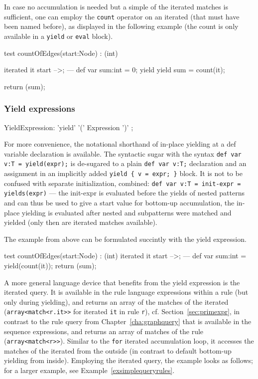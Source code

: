 In case no accumulation is needed but a simple  of the iterated matches is sufficient, one can employ the \texttt{count} operator on an iterated (that must have been named before), as displayed in the following example (the count is only available in a \texttt{yield} or \texttt{eval} block).

\begin{example}
  \begin{grgen}
test countOfEdges(start:Node) : (int)
{
	iterated it {
		start -->;
	} 
---
	def var sum:int = 0;
	yield {
		yield sum = count(it);
	}

	return (sum);
}
  \end{grgen}
\end{example}

\subsubsection*{Yield expressions} 

\begin{rail} 
  YieldExpression: 'yield' '(' Expression ')' ;
\end{rail}

For more convenience, the notational shorthand of in-place yielding at a def variable declaration is available.
The syntactic sugar with the syntax \texttt{def var v:T = yield(expr);} is de-sugared to a plain \texttt{def var v:T;} declaration and an assignment in an implicitly added \verb#yield { v = expr; }# block.
It is not to be confused with separate initialization, combined: \texttt{def var v:T = init-expr = yields(expr)} --- the init-expr is evaluated before the yields of nested patterns and can thus be used to give a start value for bottom-up accumulation, the in-place yielding is evaluated after nested and subpatterns were matched and yielded (only then are iterated matches available).

The example from above can be formulated succintly with the yield expression.

\begin{example}
  \begin{grgen}
test countOfEdges(start:Node) : (int)
{
	iterated it {
		start -->;
	} 
---
	def var sum:int = yield(count(it));
	return (sum);
}
  \end{grgen}
\end{example}


A more general language device that benefits from the yield expression is the iterated query. 
It is available in the rule language expressions within a rule (but only during yielding), and returns an array of the matches of the iterated (\texttt{array<match<r.it>>} for iterated \texttt{it} in rule \texttt{r}), cf. Section~\ref{sec:primexpr}, in contrast to the rule query from Chapter~\ref{cha:graphquery} that is available in the sequence expressions, and returns an array of matches of the rule (\texttt{array<match<r>>}).
Similar to the \texttt{for} iterated accumulation loop, it accesses the matches of the iterated from the outside (in contrast to default bottom-up yielding from inside).
Employing the iterated query, the example looks as follows; for a larger example, see Example~\ref{exsimplequeryrules}.

